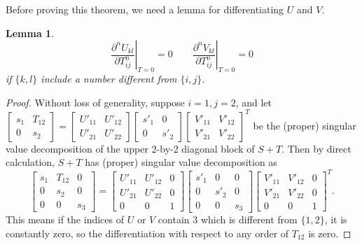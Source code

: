\documentclass[10pt]{article}
\newtheorem{lemma}{Lemma}
\begin{document}
Before proving this theorem, we need a lemma for differentiating $U$ and $V$.
\begin{lemma}
	\begin{equation}
		\left. \frac{\partial^n U_{kl}}{\partial T_{ij}^n} \right|_{T=0} = 0 \qquad
		\left. \frac{\partial^n V_{kl}}{\partial T_{ij}^n} \right|_{T=0} = 0
	\end{equation}
	if $\{k,l\}$ include a number different from $\{i,j\}$.
\end{lemma}
\begin{proof}
	Without loss of generality, suppose $i=1,j=2$, and let $\begin{bmatrix} s_1 & T_{12} \\ 0 & s_2 \end{bmatrix} = \begin{bmatrix} U'_{11} & U'_{12} \\ U'_{21} & U'_{22} \end{bmatrix} \begin{bmatrix} s'_1 & 0 \\ 0 & s'_2 \end{bmatrix} \begin{bmatrix} V'_{11} & V'_{12} \\ V'_{21} & V'_{22} \end{bmatrix}^T$ be the (proper) singular value decomposition of the upper 2-by-2 diagonal block of $S+T$.
	Then by direct calculation, $S+T$ has (proper) singular value decomposition as
	\begin{equation*}
		\begin{bmatrix}
			s_1 & T_{12} & 0 \\
			0 & s_2 & 0 \\
			0 & 0 & s_3
		\end{bmatrix} = \begin{bmatrix}
			U'_{11} & U'_{12} & 0 \\
			U'_{21} & U'_{22} & 0 \\
			0 & 0 & 1
		\end{bmatrix} \begin{bmatrix}
			s'_1 & 0 & 0 \\
			0 & s'_2 & 0 \\
			0 & 0 & s_3
		\end{bmatrix} \begin{bmatrix}
			V'_{11} & V'_{12} & 0 \\
			V'_{21} & V'_{22} & 0 \\
			0 & 0 & 1
		\end{bmatrix}^T.
	\end{equation*}
	This means if the indices of $U$ or $V$ contain $3$ which is different from $\{1,2\}$, it is constantly zero, so the differentiation with respect to any order of $T_{12}$ is zero. 
\end{proof}
\end{document}
